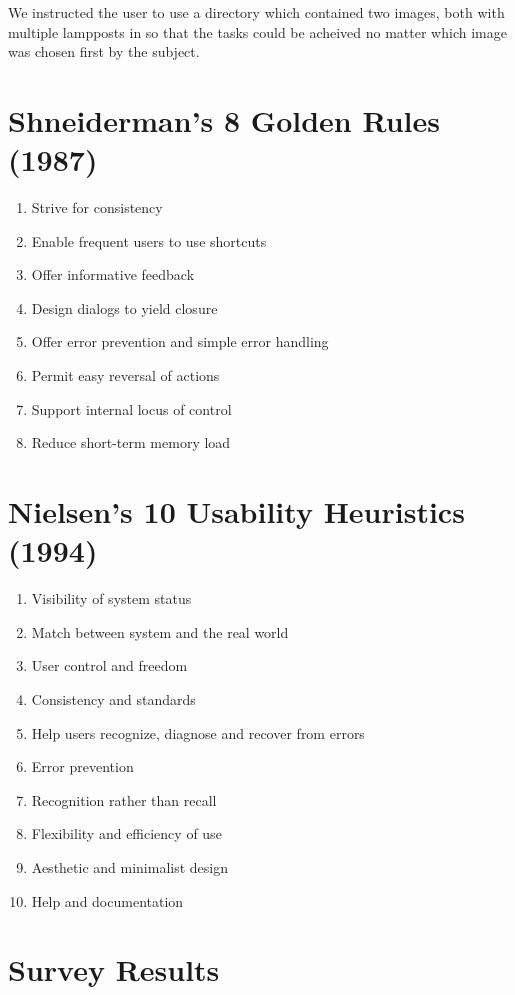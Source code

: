 \documentclass[a4paper,11pt,oneside]{article}
\begin{document}
We instructed the user to use a directory which contained two images, both with multiple lampposts in so that the tasks could be acheived no matter which image was chosen first by the subject.

\section{Shneiderman’s 8 Golden Rules (1987)}
\label{sec:s_rules}
\begin{enumerate}
\item Strive for consistency
\item Enable frequent users to use shortcuts
\item Offer informative feedback
\item Design dialogs to yield closure
\item Offer error prevention and simple error handling
\item Permit easy reversal of actions
\item Support internal locus of control
\item Reduce short-term memory load 
\end{enumerate}

\section{Nielsen’s 10 Usability Heuristics (1994)}
\label{sec:n_rules}
\begin{enumerate}
\item Visibility of system status
\item Match between system and the real world
\item User control and freedom
\item Consistency and standards
\item Help users recognize, diagnose and recover from errors
\item Error prevention
\item Recognition rather than recall
\item Flexibility and efficiency of use
\item Aesthetic and minimalist design
\item Help and documentation
\end{enumerate}

\section{Survey Results}
\label{sec:survey}
\end{document}
